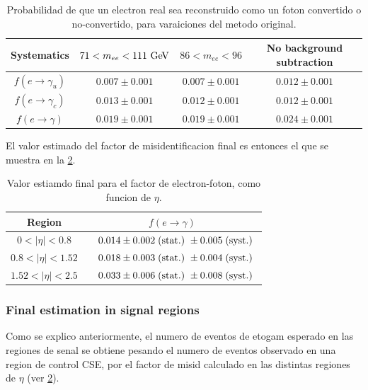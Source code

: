 \begin{table}[!h]
  \centering
  \caption{Probabilidad de que un electron real sea reconstruido como un foton
    convertido o no-convertido, para varaiciones del metodo original.}
  \begin{tabular}{cccc}
    \hline
    \hline
     Systematics       &  $71 < m_{ee} < 111 \GeV$ & $86 < m_{ee} < 96$ & No background subtraction  \\
    \hline
    $f(e\to \gamma_u)$ & $0.007 \pm 0.001$ & $0.007 \pm 0.001$ & $0.012 \pm 0.001$ \\
    $f(e\to \gamma_c)$ & $0.013 \pm 0.001$ & $0.012 \pm 0.001$ & $0.012 \pm 0.001$ \\
    $f(e\to \gamma)$   & $0.019 \pm 0.001$ & $0.019 \pm 0.001$ & $0.024 \pm 0.001$ \\
    \hline
    \hline
  \end{tabular}
  \label{tab:efake_syst}
\end{table}


El valor estimado del factor de misidentificacion final es entonces el que se muestra en la
{\tab} \ref{tab:efake_final}.

\begin{table}[!h]
  \centering
  \caption{Valor estiamdo final para el factor de {\misid} electron-foton, como funcion de $\eta$.}
  \begin{tabular}{cc}
    \hline
    \hline
     Region                &  $f(e\to \gamma)$  \\
    \hline
      $0 < |\eta| < 0.8$     & $ \quad  0.014 \pm 0.002 \mbox{$\;$(stat.)}\ \pm 0.005 \mbox{$\;$(syst.)}\ $ \\
      $0.8 < |\eta| < 1.52$  & $ \quad  0.018 \pm 0.003 \mbox{$\;$(stat.)}\ \pm 0.004 \mbox{$\;$(syst.)}\ $ \\
      $1.52 < |\eta| < 2.5$  & $ \quad  0.033 \pm 0.006 \mbox{$\;$(stat.)}\ \pm 0.008 \mbox{$\;$(syst.)}\ $ \\
    \hline
  \end{tabular}
  \label{tab:efake_final}
\end{table}

\subsubsection{Final estimation in signal regions} \label{sec:efakes_estimation}

Como se explico anteriormente, el numero de eventos de etogam esperado en las regiones
de senal se obtiene pesando el numero de eventos observado en una region  de control CSE,
por el factor de misid calculado en las distintas regiones de $\eta$ (ver {\tab} \ref{tab:efake_final}).

